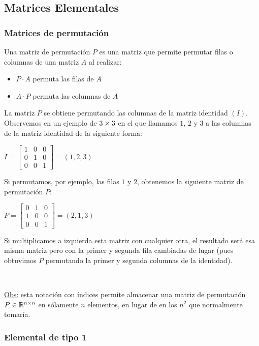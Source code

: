 \documentclass[]{article}
\begin{document}
\subsection{Matrices Elementales}
\subsubsection{Matrices de permutación}
Una matriz de permutación $P$ es una matriz que permite permutar filas o columnas de una matriz $A$ al realizar:
\begin{itemize}
	\item $P \cdot A$ permuta las filas de $A$
	\item $A \cdot P$ permuta las columnas de $A$
\end{itemize}

La matriz $P$ se obtiene permutando las columnas de la matriz identidad $(I)$. Observemos en un ejemplo de $3 \times 3$ en el que llamamos $1$, $2$ y $3$ a las columnas de la matriz identidad de la siguiente forma:
\begin{center}
	$I = \begin{bmatrix}
		1&0&0\\
		0&1&0\\
		0&0&1
	\end{bmatrix} = (1,2,3)$
\end{center}

Si permutamos, por ejemplo, las filas $1$ y $2$, obtenemos la siguiente matriz de permutación $P$:
\begin{center}
	$P=\begin{bmatrix}
		0&1&0\\
		1&0&0\\
		0&0&1
	\end{bmatrix} = (2,1,3)$
\end{center}

Si multiplicamos a izquierda esta matriz con cualquier otra, el resultado será esa misma matriz pero con la primer y segunda fila cambiadas de lugar (pues obtuvimos $P$ permutando la primer y segunda columnas de la identidad).

~\newline

\underline{Obs:} esta notación con índices permite almacenar una matriz de permutación $P\in\mathbb{R}^{n\times n}$ en sólamente $n$ elementos, en lugar de en los $n^2$ que normalmente tomaría.


\subsubsection{Elemental de tipo 1}
\end{document}

